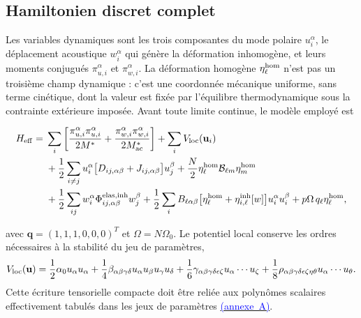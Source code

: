 \subsection{Hamiltonien discret complet}

Les variables dynamiques sont les trois composantes du mode polaire
$u_i^\alpha$, le déplacement acoustique $w_i^\alpha$ qui génère la déformation
inhomogène, et leurs moments conjugués $\pi_{u,i}^\alpha$ et
$\pi_{w,i}^\alpha$. La déformation homogène
$\eta_\ell^{\rm hom}$ n'est pas un troisième champ dynamique : c'est une
coordonnée mécanique uniforme, sans terme cinétique, dont la valeur est fixée
par l'équilibre thermodynamique sous la contrainte extérieure imposée. Avant
toute limite continue, le modèle employé est
\begin{mdframed}[linecolor=red!60!black,nobreak=true]
\small
\begin{equation}
\begin{aligned}
H_{\rm eff}={}&\sum_i\left[
\frac{\pi_{u,i}^\alpha\pi_{u,i}^\alpha}{2M^*}
+\frac{\pi_{w,i}^\alpha\pi_{w,i}^\alpha}{2M^*_{\rm ac}}
\right]
+\sum_i V_{\rm loc}(\mathbf u_i)\\
&+\frac12\sum_{i\ne j}u_i^\alpha
\big[D_{ij,\alpha\beta}+J_{ij,\alpha\beta}\big]u_j^\beta
+\frac N2\eta_\ell^{\rm hom}\mathcal B_{\ell m}
\eta_m^{\rm hom}\\
&+\frac12\sum_{ij}w_i^\alpha
\Phi^{\rm elas,inh}_{ij,\alpha\beta}w_j^\beta
+\frac12\sum_iB_{\ell\alpha\beta}
\big[\eta_\ell^{\rm hom}+\eta_{i,\ell}^{\rm inh}[w]\big]
u_i^\alpha u_i^\beta
+p\Omega\,q_\ell\eta_\ell^{\rm hom},
\end{aligned}
\label{eq:core_full_discrete_hamiltonian}
\end{equation}
\end{mdframed}
avec $\mathbf q=(1,1,1,0,0,0)^T$ et $\Omega=N\Omega_0$. Le potentiel local
conserve les ordres nécessaires à la stabilité du jeu de paramètres,
\begin{equation}
V_{\rm loc}(\mathbf u)
=\frac12\alpha_0u_\alpha u_\alpha
+\frac14\beta_{\alpha\beta\gamma\delta}
u_\alpha u_\beta u_\gamma u_\delta
+\frac16\gamma_{\alpha\beta\gamma\delta\epsilon\zeta}
u_\alpha\cdots u_\zeta
+\frac18\rho_{\alpha\beta\gamma\delta\epsilon\zeta\eta\theta}
u_\alpha\cdots u_\theta .
\label{eq:core_local_potential_tensor}
\end{equation}
Cette écriture tensorielle compacte doit être reliée aux polynômes scalaires
effectivement tabulés dans les jeux de paramètres
\hyperref[sec:core_parameter_sets]{\textcolor{blue}{(annexe~A)}}.
